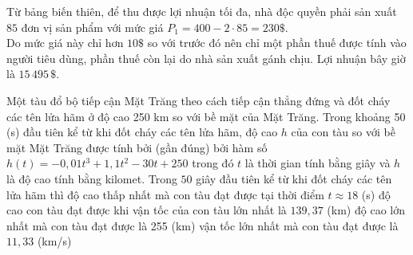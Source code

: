 \begin{ex}
{\begin{itemchoice}
\begin{center}
			\end{center}
			 Từ bảng biến thiên, để thu được lợi nhuận tối đa, nhà độc quyền phải sản xuất $85$ đơn vị sản phẩm với mức giá $P_1=400-2 \cdot 85=230 \$$.\\
			Do mức giá này chỉ hơn $10 \$$ so với trước đó nên chỉ một phần thuế  được tính vào người tiêu dùng, phần thuế còn lại do nhà sản xuất gánh chịu. Lợi nhuận bây giờ là $15\,495\, \$$.
		\end{itemchoice}
	} 
\end{ex}

\begin{ex}%
	Một tàu đổ bộ tiếp cận Mặt Trăng theo cách tiếp cận thẳng đứng và đốt cháy các tên lửa hãm ở độ cao 250 km so với bề mặt của Mặt Trăng. Trong khoảng 50 (s) đầu tiên kể từ  khi đốt cháy các tên lửa hãm, độ cao $h$ của con tàu so với bề mặt Mặt Trăng được tính bởi (gần đúng) bởi hàm số $h(t)=-0{,}01t^3+1{,}1t^2-30t+250$ trong đó $t$ là thời gian tính bằng giây và $h$ là độ cao tính bằng kilomet. Trong $50$ giây đầu tiên kể từ khi đốt cháy các tên lửa hãm thì
	 \choiceTF
		{\True độ cao thấp nhất mà con tàu đạt được tại thời điểm $t\approx 18$ (s)} 
		{độ cao con tàu đạt được khi vận tốc của con tàu  lớn nhất là $139{,}37$ (km)}
		{độ cao lớn nhất mà con tàu đạt được  là 255 (km)}
		{vận tốc lớn  nhất mà con tàu đạt được là $11{,}33$ (km/s)}
\end{ex}
